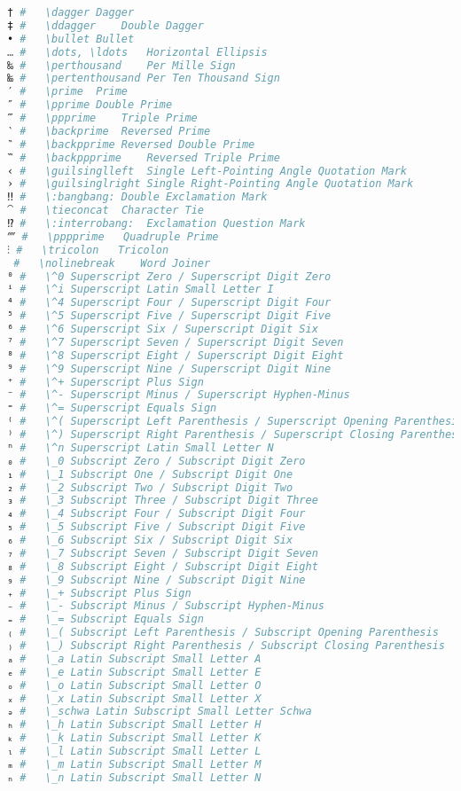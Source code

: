 \begin{lstlisting}[language=Julia, style=julia, linewidth=\textwidth]
† #   \dagger Dagger
‡ #   \ddagger    Double Dagger
• #   \bullet Bullet
… #   \dots, \ldots   Horizontal Ellipsis
‰ #   \perthousand    Per Mille Sign
‱ #   \pertenthousand Per Ten Thousand Sign
′ #   \prime  Prime
″ #   \pprime Double Prime
‴ #   \ppprime    Triple Prime
‵ #   \backprime  Reversed Prime
‶ #   \backpprime Reversed Double Prime
‷ #   \backppprime    Reversed Triple Prime
‹ #   \guilsinglleft  Single Left-Pointing Angle Quotation Mark
› #   \guilsinglright Single Right-Pointing Angle Quotation Mark
‼ #   \:bangbang: Double Exclamation Mark
⁀ #   \tieconcat  Character Tie
⁉ #   \:interrobang:  Exclamation Question Mark
⁗ #   \pppprime   Quadruple Prime
⁝ #   \tricolon   Tricolon
⁠ #   \nolinebreak    Word Joiner
⁰ #   \^0 Superscript Zero / Superscript Digit Zero
ⁱ #   \^i Superscript Latin Small Letter I
⁴ #   \^4 Superscript Four / Superscript Digit Four
⁵ #   \^5 Superscript Five / Superscript Digit Five
⁶ #   \^6 Superscript Six / Superscript Digit Six
⁷ #   \^7 Superscript Seven / Superscript Digit Seven
⁸ #   \^8 Superscript Eight / Superscript Digit Eight
⁹ #   \^9 Superscript Nine / Superscript Digit Nine
⁺ #   \^+ Superscript Plus Sign
⁻ #   \^- Superscript Minus / Superscript Hyphen-Minus
⁼ #   \^= Superscript Equals Sign
⁽ #   \^( Superscript Left Parenthesis / Superscript Opening Parenthesis
⁾ #   \^) Superscript Right Parenthesis / Superscript Closing Parenthesis
ⁿ #   \^n Superscript Latin Small Letter N
₀ #   \_0 Subscript Zero / Subscript Digit Zero
₁ #   \_1 Subscript One / Subscript Digit One
₂ #   \_2 Subscript Two / Subscript Digit Two
₃ #   \_3 Subscript Three / Subscript Digit Three
₄ #   \_4 Subscript Four / Subscript Digit Four
₅ #   \_5 Subscript Five / Subscript Digit Five
₆ #   \_6 Subscript Six / Subscript Digit Six
₇ #   \_7 Subscript Seven / Subscript Digit Seven
₈ #   \_8 Subscript Eight / Subscript Digit Eight
₉ #   \_9 Subscript Nine / Subscript Digit Nine
₊ #   \_+ Subscript Plus Sign
₋ #   \_- Subscript Minus / Subscript Hyphen-Minus
₌ #   \_= Subscript Equals Sign
₍ #   \_( Subscript Left Parenthesis / Subscript Opening Parenthesis
₎ #   \_) Subscript Right Parenthesis / Subscript Closing Parenthesis
ₐ #   \_a Latin Subscript Small Letter A
ₑ #   \_e Latin Subscript Small Letter E
ₒ #   \_o Latin Subscript Small Letter O
ₓ #   \_x Latin Subscript Small Letter X
ₔ #   \_schwa Latin Subscript Small Letter Schwa
ₕ #   \_h Latin Subscript Small Letter H
ₖ #   \_k Latin Subscript Small Letter K
ₗ #   \_l Latin Subscript Small Letter L
ₘ #   \_m Latin Subscript Small Letter M
ₙ #   \_n Latin Subscript Small Letter N

\end{lstlisting}
